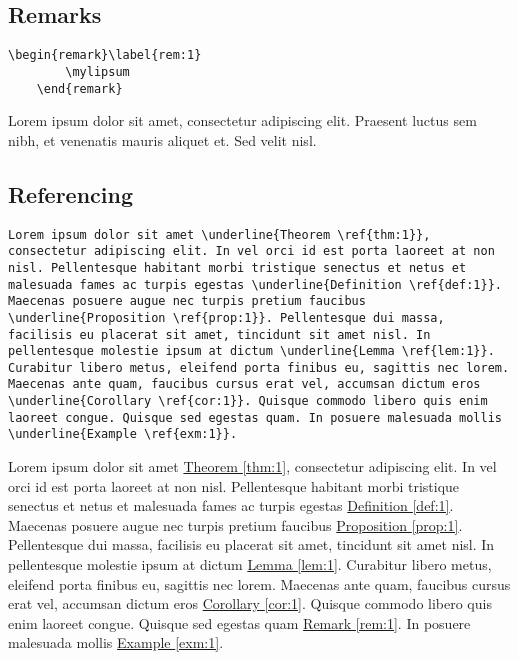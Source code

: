 \documentclass{article}
\newcommand{\mylipsum}{Lorem ipsum dolor sit amet, consectetur adipiscing elit. Praesent luctus sem nibh, et venenatis mauris aliquet et. Sed velit nisl.}
\begin{document}
	\subsection{Remarks}
	\begin{Verbatim}[tabsize=4]
	\begin{remark}\label{rem:1}
		\mylipsum
	\end{remark}
	\end{Verbatim}
	\begin{remark}\label{rem:1}
		\mylipsum
	\end{remark}
	
	\subsection*{Referencing}
	\begin{Verbatim}[breaklines=true]
	Lorem ipsum dolor sit amet \underline{Theorem \ref{thm:1}}, consectetur adipiscing elit. In vel orci id est porta laoreet at non nisl. Pellentesque habitant morbi tristique senectus et netus et malesuada fames ac turpis egestas \underline{Definition \ref{def:1}}. Maecenas posuere augue nec turpis pretium faucibus \underline{Proposition \ref{prop:1}}. Pellentesque dui massa, facilisis eu placerat sit amet, tincidunt sit amet nisl. In pellentesque molestie ipsum at dictum \underline{Lemma \ref{lem:1}}. Curabitur libero metus, eleifend porta finibus eu, sagittis nec lorem. Maecenas ante quam, faucibus cursus erat vel, accumsan dictum eros \underline{Corollary \ref{cor:1}}. Quisque commodo libero quis enim laoreet congue. Quisque sed egestas quam. In posuere malesuada mollis \underline{Example \ref{exm:1}}.
	\end{Verbatim}

	Lorem ipsum dolor sit amet \underline{Theorem \ref{thm:1}}, consectetur adipiscing elit. In vel orci id est porta laoreet at non nisl. Pellentesque habitant morbi tristique senectus et netus et malesuada fames ac turpis egestas \underline{Definition \ref{def:1}}. Maecenas posuere augue nec turpis pretium faucibus \underline{Proposition \ref{prop:1}}. Pellentesque dui massa, facilisis eu placerat sit amet, tincidunt sit amet nisl. In pellentesque molestie ipsum at dictum \underline{Lemma \ref{lem:1}}. Curabitur libero metus, eleifend porta finibus eu, sagittis nec lorem. Maecenas ante quam, faucibus cursus erat vel, accumsan dictum eros \underline{Corollary \ref{cor:1}}. Quisque commodo libero quis enim laoreet congue. Quisque sed egestas quam \underline{Remark \ref{rem:1}}. In posuere malesuada mollis \underline{Example \ref{exm:1}}.
	
\end{document}
